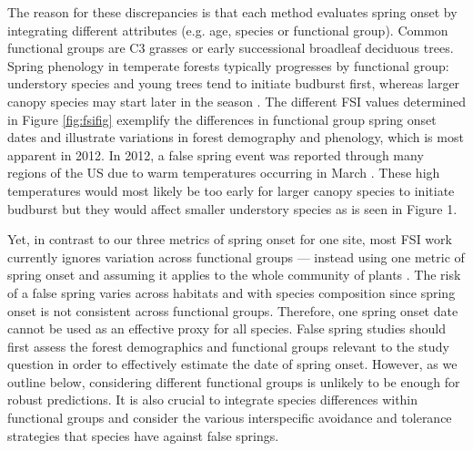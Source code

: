 \documentclass{article}\usepackage[]{graphicx}\usepackage[]{color}
\begin{document}
The reason for these discrepancies is that each method evaluates spring onset by integrating different attributes (e.g. age, species or functional group). Common functional groups are C3 grasses or early successional broadleaf deciduous trees. Spring phenology in temperate forests typically progresses by functional group: understory species and young trees tend to initiate budburst first, whereas larger canopy species may start later in the season \citep{Richardson2009, Xin2016}. The different FSI values determined in Figure \ref{fig:fsifig} exemplify the differences in functional group spring onset dates and illustrate variations in forest demography and phenology, which is most apparent in 2012. In 2012, a false spring event was reported through many regions of the US due to warm temperatures occurring in March \citep{Ault2015}. These high temperatures would most likely be too early for larger canopy species to initiate budburst but they would affect smaller understory species as is seen in Figure 1. 

Yet, in contrast to our three metrics of spring onset for one site, most FSI work currently ignores variation across functional groups --- instead using one metric of spring onset and assuming it applies to the whole community of plants \citep{Marino2011, Peterson2014, Allstadt2015, Mehdipoor2017}. The risk of a false spring varies across habitats and with species composition since spring onset is not consistent across functional groups. Therefore, one spring onset date cannot be used as an effective proxy for all species. False spring studies should first assess the forest demographics and functional groups relevant to the study question in order to effectively estimate the date of spring onset. However, as we outline below, considering different functional groups is unlikely to be enough for robust predictions. It is also crucial to integrate species differences within functional groups and consider the various interspecific avoidance and tolerance strategies that species have against false springs. %
\end{document}

